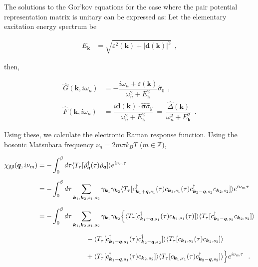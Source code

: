 \documentclass[a4j]{jsarticle}
\begin{document}
The solutions to the Gor'kov equations for the case where the pair potential representation matrix is unitary can be expressed as:
Let the elementary excitation energy spectrum be

\begin{align}
	E_{\bm{k}}
	&=
	\sqrt{
		\varepsilon^{2}(\bm{k}) + | \bm{d}(\bm{k}) |^{2}
	}
	\ \ ,
\end{align}

then,

\begin{align}
	\hat{G}(\bm{k} , i \omega_{n})
	&=
	-
	\dfrac{ i \omega_{n} + \varepsilon(\bm{k}) }
	{ \omega_{n}^{2} + E_{\bm{k}}^{2} }
	\hat{\sigma}_{0}
	\ \ ,
	\\[2mm]
	\hat{F}(\bm{k},i \omega_{n})
	&=
	\dfrac{ i \bm{d}(\bm{k}) \cdot \hat{\bm{\sigma}} \hat{\sigma}_{y} }
	{ \omega_{n}^{2} + E_{\bm{k}}^{2} }
	\ = \
	\dfrac{ \hat{\Delta}(\bm{k}) }
	{ \omega_{n}^{2} + E_{\bm{k}}^{2} }
	\ \ .
\end{align}

Using these, we calculate the electronic Raman response function.
Using the bosonic Matsubara frequency $\nu_{n}=2m\pi k_{B} T$ ($m \in \mathbb{Z}$),

\begin{align}
	\chi_{\tilde{\rho} \tilde{\rho}}(\bm{q},i \nu_{m})
	&=
	-
	\int^{\beta}_{0} d \tau
	\langle T_{\tau}[ \tilde{\rho}_{\bm{q}}^{\dagger} (\tau) \tilde{\rho}_{\bm{q}} ] \rangle
	e^{i \nu_{m} \tau}
	\nonumber \\[2mm]
	&=
	-
	\int^{\beta}_{0} d \tau
	\sum_{\bm{k}_{1} , \bm{k}_{2} , s_{1} ,s_{2} }
	\gamma_{\bm{k}_{1}}
	\gamma_{\bm{k}_{2}}
	\langle T_{\tau} [
			c_{ \bm{k}_{1}+\bm{q} , s_{1} }^{\dagger} (\tau)
			c_{ \bm{k}_{1} , s_{1} } (\tau)
			c_{ \bm{k}_{2}-\bm{q} , s_{2} }^{\dagger}
			c_{ \bm{k}_{2} , s_{2} }
		] \rangle
	e^{i \nu_{m} \tau}
	\nonumber \\[2mm]
	&=
	-
	\int^{\beta}_{0} d \tau
	\sum_{\bm{k}_{1} , \bm{k}_{2} , s_{1} ,s_{2} }
	\gamma_{\bm{k}_{1}}
	\gamma_{\bm{k}_{2}}
	\Big\{
	\langle T_{\tau} [
			c_{ \bm{k}_{1}+\bm{q} , s_{1} }^{\dagger} (\tau)
			c_{ \bm{k}_{1} , s_{1} } (\tau)
		] \rangle
	\langle T_{\tau} [
			c_{ \bm{k}_{2}-\bm{q} , s_{2} }^{\dagger}
			c_{ \bm{k}_{2} , s_{2} }
		] \rangle
	\nonumber \\[2mm]
	& \hspace{25mm} -
	\langle T_{\tau} [
			c_{ \bm{k}_{1}+\bm{q} , s_{1} }^{\dagger} (\tau)
			c_{ \bm{k}_{2}-\bm{q} , s_{2} }^{\dagger}
		] \rangle
	\langle T_{\tau} [
			c_{ \bm{k}_{1} , s_{1} } (\tau)
			c_{ \bm{k}_{2} , s_{2} }
		] \rangle
	\nonumber \\[2mm]
	& \hspace{25mm} +
	\langle T_{\tau} [
			c_{ \bm{k}_{1}+\bm{q} , s_{1} }^{\dagger} (\tau)
			c_{ \bm{k}_{2} , s_{2} }
		] \rangle
	\langle T_{\tau} [
			c_{ \bm{k}_{1} , s_{1} } (\tau)
			c_{ \bm{k}_{2}-\bm{q} , s_{2} }^{\dagger}
		] \rangle
	\Big\}
	e^{i \nu_{m} \tau}
	\ \ .
\end{align}
\end{document}
